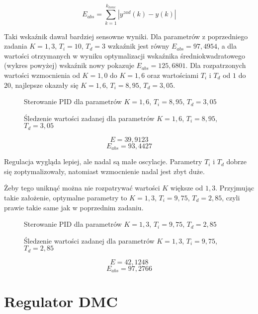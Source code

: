 \begin{equation}
E_{abs} = \sum_{k=1}^{k_{konc}} |y^{zad}(k) - y(k)|
\end{equation}

Taki wskaźnik dawał bardziej sensowne wyniki. Dla parametrów z poprzedniego zadania $K=1,3$, $T_i=10$, $T_d=3$ wzkaźnik jest równy $E_{abs} = 97,4954$, a dla wartości otrzymanych w wyniku optymalizacji wskaźnika średniokwadratowego (wykres powyżej) wskaźnik nowy pokazuje $E_{abs} = 125,6801$.
Dla rozpatrzonych wartości wzmocnienia od $K=1,0$ do $K=1,6$ oraz wartościami $T_i$ i $T_d$ od $1$ do $20$, najlepsze okazały się $K=1,6$, $T_i=8,95$, $T_d=3,05$.

\begin{figure}[H]
\centering

\caption{Sterowanie PID dla parametrów $K=1,6$, $T_i=8,95$,  $T_d=3,05$}
\end{figure}

\begin{figure}[H]
\centering

\caption{Śledzenie wartości zadanej dla parametrów $K=1,6$, $T_i=8,95$,  $T_d=3,05$}
\end{figure}

\begin{equation}
E = 39,9123 
\end{equation}
\begin{equation}
E_{abs} = 93,4427
\end{equation}

Regulacja wygląda lepiej, ale nadal są małe oscylacje. Parametry $T_i$ i $T_d$ dobrze się zoptymalizowały, natomiast wzmocnienie nadal jest zbyt duże.

Żeby tego uniknąć można nie rozpatrywać wartości $K$ większe od $1,3$. Przyjmując takie założenie, optymalne parametry to $K=1,3$, $T_i = 9,75$, $T_d=2,85$, czyli prawie takie same jak w poprzednim zadaniu.

\begin{figure}[H]
\centering

\caption{Sterowanie PID dla parametrów $K=1,3$, $T_i=9,75$,  $T_d=2,85$}
\end{figure}

\begin{figure}[H]
\centering

\caption{Śledzenie wartości zadanej dla parametrów $K=1,3$, $T_i=9,75$,  $T_d=2,85$}
\end{figure}

\begin{equation}
E = 42,1248
\end{equation}
\begin{equation}
E_{abs} = 97,2766
\end{equation}

\section{Regulator DMC}




